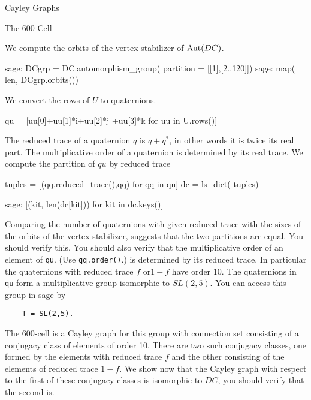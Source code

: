 \begin{chap}{Cayley Graphs}
\begin{sect}{The 600-Cell}
\begin{para}
We compute the orbits of the vertex stabilizer of $\mathrm{Aut}(DC)$.
\end{para}
%
\begin{sageexample}
sage: DCgrp = DC.automorphism_group( partition = [[1],[2..120]])
sage: map( len, DCgrp.orbits())
\end{sageexample}
%
\begin{para}
We convert the rows of $U$ to quaternions.
\end{para}
%
\begin{sageblock}
qu = [uu[0]+uu[1]*i+uu[2]*j +uu[3]*k for uu in U.rows()]
\end{sageblock}
%
\begin{para}
The reduced trace of a quaternion $q$ is $q+q^*$, in other words it is
twice its real part. The multiplicative order of a quaternion is determined
by its real trace. We compute the partition of $qu$ by reduced trace
\end{para}
%
\begin{sageblock}
tuples = [(qq.reduced_trace(),qq) for qq in qu]
dc = ls_dict( tuples)
\end{sageblock}
%
\begin{sageexample}
sage: [(kit, len(dc[kit])) for kit in dc.keys()]
\end{sageexample}
%
\begin{para}
Comparing the number of quaternions with given reduced trace with the
sizes of the orbits of the vertex stabilizer, suggests that the two partitions
are equal. You should verify this. You should also verify that the
multiplicative order of an element of \verb|qu|. (Use \verb|qq.order()|.)
is determined by its reduced trace. In particular the quaternions
with reduced trace $f$ or$1-f$ have order 10. The quaternions in
\verb|qu| form a multiplicative group isomorphic to $SL(2,5)$.
You can access this group in sage by
\end{para}
%
\begin{verbatim}
    T = SL(2,5).
\end{verbatim}
%
\begin{para}
The 600-cell is a Cayley graph for this group with connection
set consisting of a conjugacy class of elements of order 10.
There are two such conjugacy classes, one formed by the elements
with reduced trace $f$ and the other consisting of the elements of reduced
trace $1-f$. We show now that the Cayley graph with respect to the first of these
conjugacy classes is isomorphic to $DC$, you should verify that the second is.
\end{para}

\end{sect}
\end{chap}
